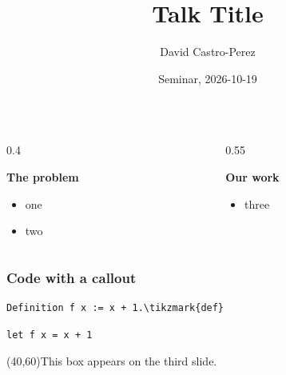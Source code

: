 \documentclass{ltx-talk}
\title{Talk Title}
\author{David Castro-Perez}
\date{Seminar, 2026-10-19}
\begin{document}

\begin{frame}
  \begin{columns}
    \begin{column}{0.4\textwidth}
      \begin{sticky}
        \textbf{The problem}
        \begin{itemize}
          \item one
          \item two
        \end{itemize}
      \end{sticky}
    \end{column}
    \begin{column}{0.55\textwidth}
      \begin{sticky}
        \textbf{Our work}
        \begin{itemize}
          \item three
        \end{itemize}
      \end{sticky}
    \end{column}
  \end{columns}
\end{frame}


\begin{frame*}
  \frametitle{Code with a callout}
  \begin{bluebox}
\begin{Verbatim}[commandchars=\\\{\}]
Definition f x := x + 1.\tikzmark{def}
\end{Verbatim}
  \end{bluebox}
  \begin{greenbox}
\begin{Verbatim}
let f x = x + 1
\end{Verbatim}
  \end{greenbox}
  (40,60){This box appears on the third slide.}
\end{frame*}
\end{document}
